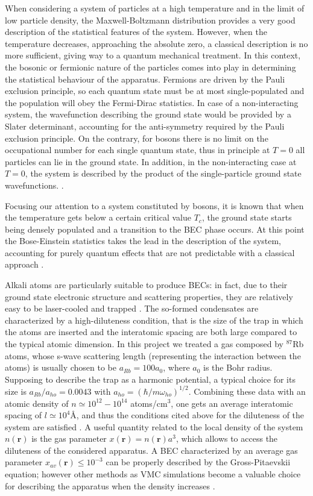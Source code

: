 When considering a system of particles at a high temperature and in the limit of low particle density, the Maxwell-Boltzmann distribution provides a very good description of the statistical features of the system. However, when the temperature decreases, approaching the absolute zero, a classical description is no more sufficient, giving way to a quantum mechanical treatment. In this context, the bosonic or fermionic nature of the particles comes into play in determining the statistical behaviour of the apparatus. Fermions are driven by the Pauli exclusion principle, so each quantum state must be at most single-populated and the population will obey the Fermi-Dirac statistics. In case of a non-interacting system, the wavefunction describing the ground state would be provided by a Slater determinant, accounting for the anti-symmetry required by the Pauli exclusion principle. On the contrary, for bosons there is no limit on the occupational number for each single quantum state, thus in principle at $T=0$ all particles can lie in the ground state. In addition, in the non-interacting case at $T=0$, the system is described by the product of the single-particle ground state wavefunctions. \cite{dalfovo1999}.

Focusing our attention to a system constituted by bosons, it is known that when the temperature gets below a certain critical value $T_c$, the ground state starts being densely populated and a transition to the BEC phase occurs. At this point the Bose-Einstein statistics takes the lead in the description of the system, accounting for purely quantum effects that are not predictable with a classical approach \cite{dalfovo1999}.

Alkali atoms are particularly suitable to produce BECs: in fact, due to their ground state electronic structure and scattering properties, they are relatively easy to be laser-cooled and trapped \cite{dalfovo1999}. The so-formed condensates are characterized by a high-diluteness condition, that is the size of the trap in which the atoms are inserted and the interatomic spacing are both large compared to the typical atomic dimension. In this project we treated a gas composed by $^{87}$Rb atoms, whose s-wave scattering length (representing the interaction between the atoms) is usually chosen to be $a_{Rb} = 100a_0$, where $a_0$ is the Bohr radius. Supposing to describe the trap as a harmonic potential, a typical choice for its size is $a_{Rb}/a_{ho} = 0.0043$ with $a_{ho}= \left( \hbar /m \omega_{ho}\right)^{1/2}$. Combining these data with an atomic density of $n \simeq 10^{12} - 10^{14}$ atoms/cm$^3$, one gets an average interatomic spacing of $l\simeq 10^4$\AA, and thus the conditions cited above for the diluteness of the system are satisfied \cite{duBois}. A useful quantity related to the local density of the system $n(\bm{r})$ is the gas parameter $x(\bm{r}) = n(\bm{r}) a^3$, which allows to access the diluteness of the considered apparatus. A BEC characterized by an average gas parameter $x_{av}(\bm{r}) \leq 10^{-3}$ can be properly described by the Gross-Pitaevskii equation; however other methods as VMC simulations become a valuable choice for describing the apparatus when the density increases \cite{Nilsen2005}.  



